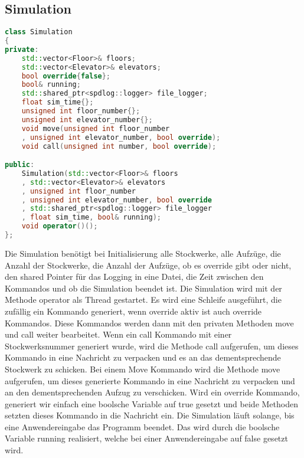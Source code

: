 \subsection{Simulation}

\begin{lstlisting}[language=C++]
class Simulation
{
private:
    std::vector<Floor>& floors;
    std::vector<Elevator>& elevators;
    bool override{false};
    bool& running;
    std::shared_ptr<spdlog::logger> file_logger;
    float sim_time{};
    unsigned int floor_number{};
    unsigned int elevator_number{};
    void move(unsigned int floor_number
    , unsigned int elevator_number, bool override);
    void call(unsigned int number, bool override);

public:
    Simulation(std::vector<Floor>& floors
    , std::vector<Elevator>& elevators
    , unsigned int floor_number
    , unsigned int elevator_number, bool override
    , std::shared_ptr<spdlog::logger> file_logger
    , float sim_time, bool& running);
    void operator()();
};
\end{lstlisting}

\vspace{5mm}

Die Simulation benötigt bei Initialisierung alle Stockwerke, alle Aufzüge, die Anzahl der Stockwerke, die Anzahl der Aufzüge, ob es override gibt oder nicht, den shared Pointer für das Logging in eine Datei, die Zeit zwischen den Kommandos und ob die Simulation beendet ist. Die Simulation wird mit der Methode operator als Thread gestartet. Es wird eine Schleife ausgeführt, die zufällig ein Kommando generiert, wenn override aktiv ist auch override Kommandos. Diese Kommandos werden dann mit den privaten Methoden move und call weiter bearbeitet. Wenn ein call Kommando mit einer Stockwerksnummer generiert wurde, wird die Methode call aufgerufen, um dieses Kommando in eine Nachricht zu verpacken und es an das dementsprechende Stockwerk zu schicken. Bei einem Move Kommando wird die Methode move aufgerufen, um dieses generierte Kommando in eine Nachricht zu verpacken und an den dementsprechenden Aufzug zu verschicken. Wird ein override Kommando, generiert wir einfach eine boolsche Variable auf true gesetzt und beide Methoden setzten dieses Kommando in die Nachricht ein. Die Simulation läuft solange, bis eine Anwendereingabe das Programm beendet. Das wird durch die boolsche Variable running realisiert, welche bei einer Anwendereingabe auf false gesetzt wird.